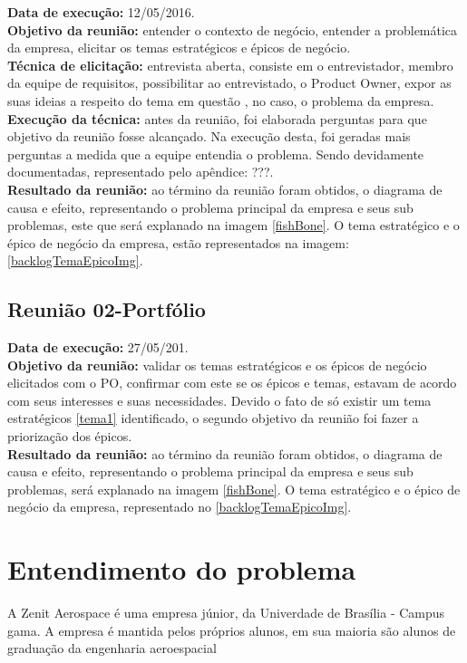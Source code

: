 \indent \textbf{Data de execução:} 12/05/2016.\\
\indent \textbf{Objetivo da reunião:} entender o contexto de negócio, entender a problemática da empresa, elicitar os temas estratégicos e épicos de negócio.\\
\indent \textbf{Técnica de elicitação:} entrevista aberta, consiste em o entrevistador, membro da equipe de requisitos, possibilitar ao entrevistado, o Product Owner, expor as suas ideias a respeito do tema em questão \cite{leffingwell2011}, no caso, o problema da empresa.\\
\indent \textbf{Execução da técnica:} antes da reunião, foi elaborada perguntas para que objetivo da reunião fosse alcançado. Na execução desta, foi geradas mais perguntas a medida que a equipe entendia o problema. Sendo devidamente documentadas, representado pelo apêndice: ???.\\
\indent \textbf{Resultado da reunião:} ao término da reunião foram obtidos, o diagrama de causa e efeito, representando o problema principal da empresa e seus sub problemas, este que será explanado na imagem \ref{fishBone}. O tema estratégico e o épico de negócio da empresa, estão representados na imagem: \ref{backlogTemaEpicoImg}.\\

\subsection{Reunião 02-Portfólio}\label{Reunião02-Portfólio}

\indent \textbf{Data de execução:} 27/05/201.\\
\indent \textbf{Objetivo da reunião:} validar os temas estratégicos e os épicos de negócio elicitados com o PO, confirmar com este se os épicos e temas, estavam de acordo com seus interesses e suas necessidades. Devido o fato de só existir um tema estratégicos \ref{tema1} identificado, o segundo objetivo da reunião foi fazer a priorização dos épicos.\\
\indent \textbf{Resultado da reunião:} ao término da reunião foram obtidos, o diagrama de causa e efeito, representando o problema principal da empresa e seus sub problemas, será explanado na imagem \ref{fishBone}. O tema estratégico e o épico de negócio da empresa, representado no \ref{backlogTemaEpicoImg}.\\

\section{Entendimento do problema}
A Zenit Aerospace é uma empresa júnior, da Univerdade de Brasília - Campus gama. A empresa é mantida pelos próprios alunos, em sua maioria são alunos de graduação da engenharia aeroespacial

